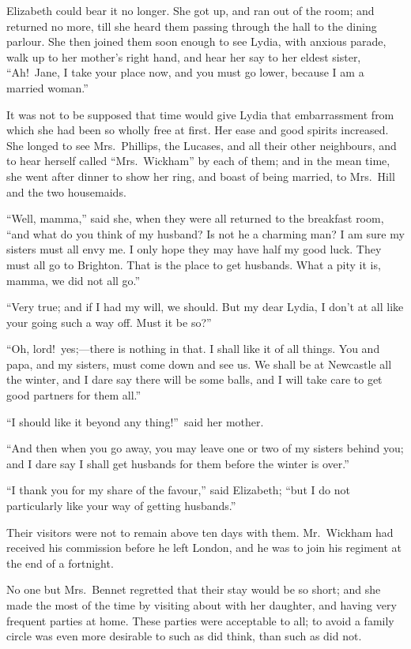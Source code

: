 \documentclass[12pt,english,oneside]{book}
\begin{document}
Elizabeth could bear it no longer. She got up, and ran out of the
room; and returned no more, till she heard them passing through the
hall to the dining parlour. She then joined them soon enough to see
Lydia, with anxious parade, walk up to her mother's right hand, and
hear her say to her eldest sister, {}``Ah!\ Jane, I take your place
now, and you must go lower, because I am a married woman.''

It was not to be supposed that time would give Lydia that embarrassment
from which she had been so wholly free at first. Her ease and good
spirits increased. She longed to see Mrs.\ Phillips, the Lucases,
and all their other neighbours, and to hear herself called {}``Mrs.\ Wickham''
by each of them; and in the mean time, she went after dinner to show
her ring, and boast of being married, to Mrs.\ Hill and the two housemaids.

{}``Well, mamma,'' said she, when they were all returned to the
breakfast room, {}``and what do you think of my husband? Is not he
a charming man? I am sure my sisters must all envy me. I only hope
they may have half my good luck. They must all go to Brighton. That
is the place to get husbands. What a pity it is, mamma, we did not
all go.''

{}``Very true; and if I had my will, we should. But my dear Lydia,
I don't at all like your going such a way off. Must it be so?''\ 

{}``Oh, lord!\ yes;\mbox{---}there is nothing in that. I shall
like it of all things. You and papa, and my sisters, must come down
and see us. We shall be at Newcastle all the winter, and I dare say
there will be some balls, and I will take care to get good partners
for them all.''

{}``I should like it beyond any thing!''\ said her mother.

{}``And then when you go away, you may leave one or two of my sisters
behind you; and I dare say I shall get husbands for them before the
winter is over.''

{}``I thank you for my share of the favour,'' said Elizabeth; {}``but
I do not particularly like your way of getting husbands.''

Their visitors were not to remain above ten days with them. Mr.\ Wickham
had received his commission before he left London, and he was to join
his regiment at the end of a fortnight.

No one but Mrs.\ Bennet regretted that their stay would be so short;
and she made the most of the time by visiting about with her daughter,
and having very frequent parties at home. These parties were acceptable
to all; to avoid a family circle was even more desirable to such as
did think, than such as did not.
\end{document}
